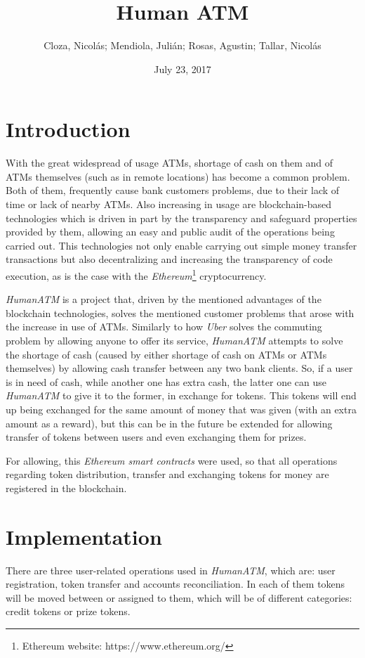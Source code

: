 \documentclass[a4paper]{article}
\title{Human ATM}
\author{Cloza, Nicolás; Mendiola, Julián; Rosas, Agustin; Tallar, Nicolás}
\date{July 23, 2017}
\begin{document}
\maketitle

\section{Introduction}

With the great widespread of usage ATMs, shortage of cash on them and of ATMs themselves (such as in remote locations) has become a common problem. Both of them, frequently cause bank customers problems, due to their lack of time or lack of nearby ATMs. Also increasing in usage are blockchain-based technologies which is driven in part by the transparency and safeguard properties provided by them, allowing an easy and public audit of the operations being carried out. This technologies not only enable carrying out simple money transfer transactions but also decentralizing and increasing the transparency of code execution, as is the case with the \textit{Ethereum}\footnote{Ethereum website: https://www.ethereum.org/} cryptocurrency.

\textit{HumanATM} is a project that, driven by the mentioned advantages of the blockchain technologies, solves the mentioned customer problems that arose with the increase in use of ATMs. Similarly to how \textit{Uber} solves the commuting problem by allowing anyone to offer its service, \textit{HumanATM} attempts to solve the shortage of cash (caused by either shortage of cash on ATMs or ATMs themselves) by allowing cash transfer between any two bank clients. So, if a user is in need of cash, while another one has extra cash, the latter one can use \textit{HumanATM} to give it to the former, in exchange for tokens. This tokens will end up being exchanged for the same amount of money that was given (with an extra amount as a reward), but this can be in the future be extended for allowing transfer of tokens between users and even exchanging them for prizes.

For allowing, this \textit{Ethereum smart contracts} were used, so that all operations regarding token distribution, transfer and exchanging tokens for money are registered in the blockchain.

\section{Implementation}

There are three user-related operations used in \textit{HumanATM}, which are: user registration, token transfer and accounts reconciliation. In each of them tokens will be moved between or assigned to them, which will be of different categories: credit tokens or prize tokens.
\end{document}
